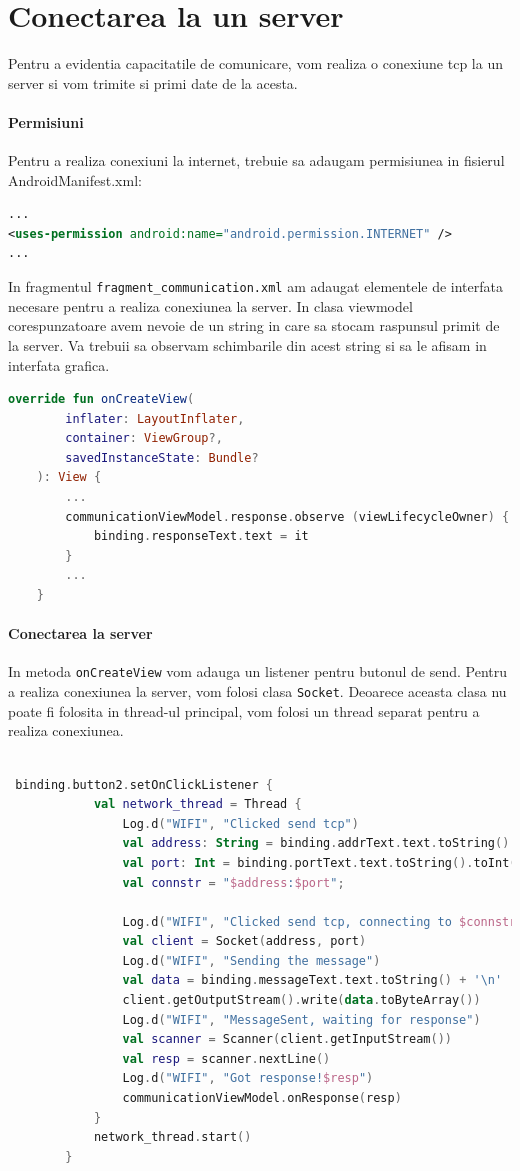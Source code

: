\section{Conectarea la un server}
Pentru a evidentia capacitatile de comunicare, vom realiza o conexiune tcp la un server si vom trimite si primi date de la acesta.
\paragraph{Permisiuni} Pentru a realiza conexiuni la internet, trebuie sa adaugam permisiunea in fisierul AndroidManifest.xml:
\begin{lstlisting}[language=XML]
...
<uses-permission android:name="android.permission.INTERNET" />
...
\end{lstlisting}
In fragmentul \texttt{fragment\_communication.xml} am adaugat elementele de interfata necesare pentru a realiza conexiunea la server.
In clasa viewmodel corespunzatoare avem nevoie de un string in care sa stocam raspunsul primit de la server.
Va trebuii sa observam schimbarile din acest string si sa le afisam in interfata grafica.
\begin{lstlisting}[language=Kotlin]
 override fun onCreateView(
        inflater: LayoutInflater,
        container: ViewGroup?,
        savedInstanceState: Bundle?
    ): View {
        ...
        communicationViewModel.response.observe (viewLifecycleOwner) {
            binding.responseText.text = it
        }
        ...
    }
\end{lstlisting}
\paragraph{Conectarea la server} In metoda \texttt{onCreateView} vom adauga un listener pentru butonul de send.
Pentru a realiza conexiunea la server, vom folosi clasa \texttt{Socket}. Deoarece
aceasta clasa nu poate fi folosita in thread-ul principal, vom folosi un thread separat pentru a realiza conexiunea.
\begin{lstlisting}[language=Kotlin]

 binding.button2.setOnClickListener {
            val network_thread = Thread {
                Log.d("WIFI", "Clicked send tcp")
                val address: String = binding.addrText.text.toString()
                val port: Int = binding.portText.text.toString().toInt()
                val connstr = "$address:$port";

                Log.d("WIFI", "Clicked send tcp, connecting to $connstr")
                val client = Socket(address, port)
                Log.d("WIFI", "Sending the message")
                val data = binding.messageText.text.toString() + '\n'
                client.getOutputStream().write(data.toByteArray())
                Log.d("WIFI", "MessageSent, waiting for response")
                val scanner = Scanner(client.getInputStream())
                val resp = scanner.nextLine()
                Log.d("WIFI", "Got response!$resp")
                communicationViewModel.onResponse(resp)
            }
            network_thread.start()
        }
\end{lstlisting}

